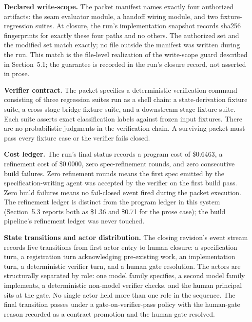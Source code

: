 \documentclass[11pt]{article}
\begin{document}
\textbf{Declared write-scope.} The packet manifest names exactly four authorized artifacts: the seam evaluator module, a handoff wiring module, and two fixture-regression suites. At closure, the run's implementation snapshot records sha256 fingerprints for exactly these four paths and no others. The authorized set and the modified set match exactly; no file outside the manifest was written during the run. This match is the file-level realization of the write-scope guard described in Section~5.1; the guarantee is recorded in the run's closure record, not asserted in prose.

\textbf{Verifier contract.} The packet specifies a deterministic verification command consisting of three regression suites run as a shell chain: a state-derivation fixture suite, a cross-stage bridge fixture suite, and a downstream-stage fixture suite. Each suite asserts exact classification labels against frozen input fixtures. There are no probabilistic judgments in the verification chain. A surviving packet must pass every fixture case or the verifier fails closed.

\textbf{Cost ledger.} The run's final status records a program cost of \$0.6463, a refinement cost of \$0.0000, zero spec-refinement rounds, and zero consecutive build failures. Zero refinement rounds means the first spec emitted by the specification-writing agent was accepted by the verifier on the first build pass. Zero build failures means no fail-closed event fired during the packet execution. The refinement ledger is distinct from the program ledger in this system (Section~5.3 reports both as \$1.36 and \$0.71 for the prose case); the build pipeline's refinement ledger was never touched.

\textbf{State transitions and actor distribution.} The closing revision's event stream records five transitions from first actor entry to human closure: a specification turn, a registration turn acknowledging pre-existing work, an implementation turn, a deterministic verifier turn, and a human gate resolution. The actors are structurally separated by role: one model family specifies, a second model family implements, a deterministic non-model verifier checks, and the human principal sits at the gate. No single actor held more than one role in the sequence. The final transition passes under a gate-on-verifier-pass policy with the human-gate reason recorded as a contract promotion and the human gate resolved.
\end{document}
